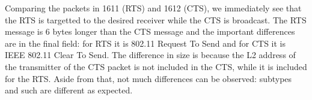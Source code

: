 Comparing the packets in 1611 (RTS) and 1612 (CTS), we immediately see that the RTS is targetted to the desired receiver while the CTS is broadcast. The RTS message is 6 bytes longer than the CTS message and the important differences are in the final field: for RTS it is 802.11 Request To Send and for CTS it is IEEE 802.11 Clear To Send.
The difference in size is because the L2 address of the transmitter of the CTS packet is not included in the CTS, while it is included for the RTS. Aside from that, not much differences can be observed: subtypes and such are different as expected.
